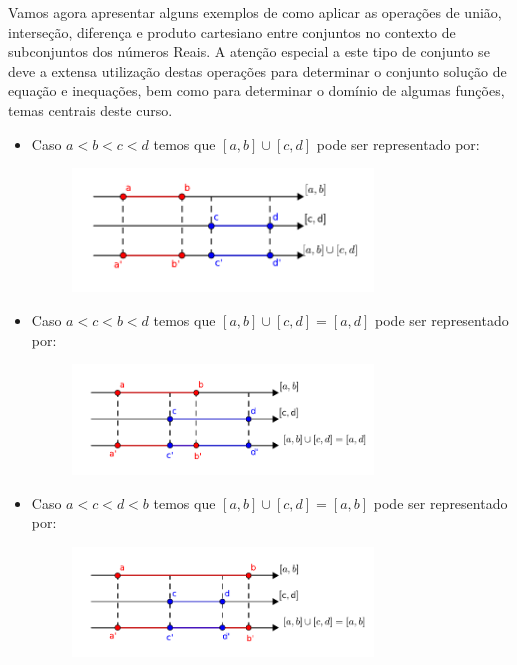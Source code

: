 Vamos agora apresentar alguns exemplos de como aplicar as operações de união, interseção, diferença e produto cartesiano entre conjuntos no contexto de subconjuntos dos números Reais. A atenção especial a este tipo de conjunto se deve a extensa utilização destas operações para determinar o conjunto solução de equação e inequações, bem como para determinar o domínio de algumas funções, temas centrais deste curso.

\begin{itemize}
 \item Caso $a< b< c< d$ temos que $[a, b] \cup [c, d]$ pode ser representado por:
  \begin{figure}[H]
 \centering
 \includegraphics[width=8cm]{../Topicos/Figuras/uniaoabcd.pdf}
 \end{figure}
 
 \item Caso $a< c< b< d$ temos que $[a, b] \cup [c, d]= [a, d]$ pode ser representado por:
  \begin{figure}[H]
 \centering
 \includegraphics[width=8cm]{../Topicos/Figuras/uniaoacbd.pdf}
 \end{figure}
 
  \item Caso $a< c< d< b$ temos que $[a, b] \cup [c, d]= [a, b]$ pode ser representado por:
  \begin{figure}[H]
 \centering
 \includegraphics[width=8cm]{../Topicos/Figuras/uniaoacdb.pdf}
 \end{figure}
 

\end{itemize}
